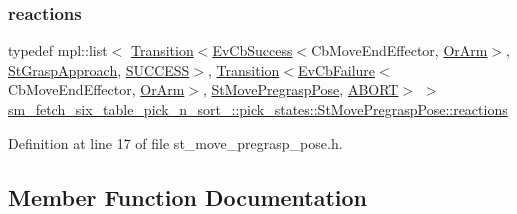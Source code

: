 \subsubsection{\texorpdfstring{reactions}{reactions}}
{\footnotesize\ttfamily typedef mpl\+::list$<$ \hyperlink{classsmacc_1_1Transition}{Transition}$<$\hyperlink{structsmacc_1_1EvCbSuccess}{Ev\+Cb\+Success}$<$Cb\+Move\+End\+Effector, \hyperlink{classsm__fetch__six__table__pick__n__sort__1_1_1OrArm}{Or\+Arm}$>$, \hyperlink{structsm__fetch__six__table__pick__n__sort__1_1_1pick__states_1_1StGraspApproach}{St\+Grasp\+Approach}, \hyperlink{structsmacc_1_1default__transition__tags_1_1SUCCESS}{S\+U\+C\+C\+E\+SS}$>$, \hyperlink{classsmacc_1_1Transition}{Transition}$<$\hyperlink{structsmacc_1_1EvCbFailure}{Ev\+Cb\+Failure}$<$Cb\+Move\+End\+Effector, \hyperlink{classsm__fetch__six__table__pick__n__sort__1_1_1OrArm}{Or\+Arm}$>$, \hyperlink{structsm__fetch__six__table__pick__n__sort__1_1_1pick__states_1_1StMovePregraspPose}{St\+Move\+Pregrasp\+Pose}, \hyperlink{structsmacc_1_1default__transition__tags_1_1ABORT}{A\+B\+O\+RT}$>$ $>$ \hyperlink{structsm__fetch__six__table__pick__n__sort__1_1_1pick__states_1_1StMovePregraspPose_ad905dc0bb7161116b0dd39b6303024af}{sm\+\_\+fetch\+\_\+six\+\_\+table\+\_\+pick\+\_\+n\+\_\+sort\+\_\+::pick\+\_\+states\+::\+St\+Move\+Pregrasp\+Pose\+::reactions}}



Definition at line 17 of file st\+\_\+move\+\_\+pregrasp\+\_\+pose.\+h.



\subsection{Member Function Documentation}
\mbox{\label{structsm__fetch__six__table__pick__n__sort__1_1_1pick__states_1_1StMovePregraspPose_adfb7cd71656d92dbd174f781b03beaea}} 
